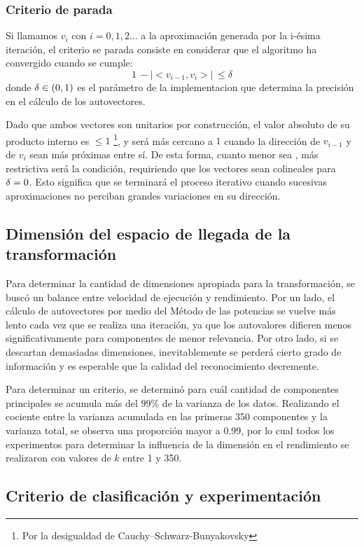 \subsubsection{Criterio de parada}

Si llamamos $v_i$ con $i = 0, 1, 2 ...$ a la aproximación generada por la i-ésima iteración, el criterio se parada consiste en considerar que el algoritmo ha convergido cuando se cumple:
$$ 1\, - \left | <v_{i-1}, v_{i}> \right | \, \leq \delta $$
donde $\delta \in \left ( 0, 1 \right )$ es el parámetro de la implementacion que determina la precisión en el cálculo de los autovectores.

Dado que ambos vectores son unitarios por construcción, el valor absoluto de su producto interno es $\leq 1$ \footnote{Por la desigualdad de Cauchy–Schwarz-Bunyakovsky}, y será más cercano a $1$ cuando la dirección de $v_{i-1}$ y de $v_{i}$ sean más próximas entre sí. De esta forma, cuanto menor sea \delt, más restrictiva será la condición, requiriendo que los vectores sean colineales para $\delta = 0$. Esto significa que se terminará el proceso iterativo cuando sucesivas aproximaciones no perciban grandes variaciones en su dirección.

\subsection{Dimensión del espacio de llegada de la transformación}

Para determinar la cantidad de dimensiones apropiada para la transformación, se buscó un balance entre velocidad de ejecución y rendimiento. Por un lado, el cálculo de autovectores por medio del Método de las potencias se vuelve más lento cada vez que se realiza una iteración, ya que los autovalores difieren menos significativamente para componentes de menor relevancia. Por otro lado, si se descartan demasiadas dimensiones, inevitablemente se perderá cierto grado de información y es esperable que la calidad del reconocimiento decremente.

Para determinar un criterio, se determinó para cuál cantidad de componentes principales se acumula más del $99\%$ de la varianza de los datos. Realizando el cociente entre la varianza acumulada en las primeras 350 componentes y la varianza total, se observa una proporción mayor a 0.99, por lo cual todos los experimentos para determinar la influencia de la dimensión en el rendimiento se realizaron con valores de $k$ entre 1 y 350.

\subsection{Criterio de clasificación y experimentación}

